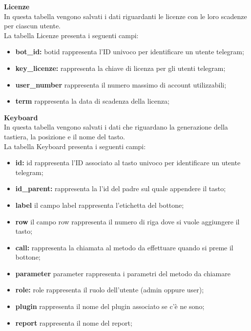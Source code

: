 \textbf{Licenze}
\\
In questa tabella vengono salvati i dati riguardanti le licenze con le loro scadenze per ciascun utente.\\

La tabella Licenze presenta i seguenti campi:

\begin{itemize}
\item \textbf{bot\_id:}  botid rappresenta l’ID univoco per identificare un utente telegram;
\item \textbf{key\_licenze:} rappresenta la chiave di licenza per gli utenti telegram;
\item \textbf{user\_number } rappresenta il numero massimo di account utilizzabili;
\item \textbf{term} rappresenta la data di scadenza della licenza;
\end{itemize}




\textbf{Keyboard}\\

In questa tabella vengono salvati i dati che riguardano la generazione della tastiera, la posizione e il nome del tasto.\\

La tabella Keyboard presenta i seguenti campi:\\

\begin{itemize}
\item \textbf{id:} id rappresenta l’ID associato al tasto univoco per identificare un utente telegram;
\item \textbf{id\_parent:} rappresenta la l’id del padre sul quale appendere il tasto;
\item \textbf{label } il campo label rappresenta l’etichetta del bottone;
\item \textbf{row } il campo row rappresenta il numero di riga dove si vuole aggiungere il tasto;
\item \textbf{call:} rappresenta la chiamata al metodo da effettuare quando si preme il bottone;
\item \textbf{parameter } parameter rappresenta i  parametri del metodo da chiamare
\item \textbf{role:} role rappresenta il ruolo dell’utente (admin oppure user);
\item \textbf{plugin } rappresenta il nome del plugin associato se c’è ne sono;
\item \textbf{report} rappresenta il nome del report;
\end{itemize}


